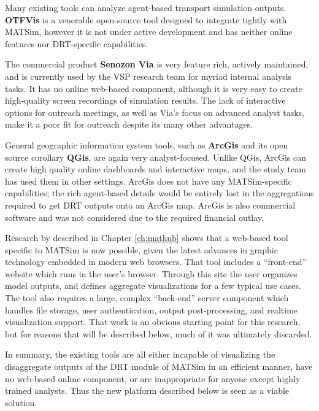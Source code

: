 Many existing tools can analyze agent-based transport simulation outputs. \textbf{OTFVis} \cite{Srippgen2015OTFVisInBook} is a venerable open-source tool designed to integrate tightly with MATSim, however it is not under active development and has neither online features nor DRT-specific capabilities.

The commercial product \textbf{Senozon Via} \cite{Rieser2015SenozonViaInBook} is very feature rich, actively maintained, and is currently used by the VSP research team for myriad internal analysis tasks. It has no online web-based component, although it is very easy to create high-quality screen recordings of simulation results. The lack of interactive options for outreach meetings, as well as Via's focus on advanced analyst tasks, make it a poor fit for outreach despite its many other advantages.

General geographic information system tools, such as \textbf{ArcGis} and its open source corollary \textbf{QGis}, are again very analyst-focused. Unlike QGis, ArcGis can create high quality online dashboards and interactive maps, and the study team has used them in other settings. ArcGis does not have any MATSim-specific capabilities; the rich agent-based details would be entirely lost in the aggregations required to get DRT outputs onto an ArcGis map. ArcGis is also commercial software and was not considered due to the required financial outlay.

Research by \citet{CharltonLaudan2020WebBasedVisualization} described in Chapter \ref{ch:mathub} shows that a web-based tool specific to MATSim is now possible, given the latest advances in graphic technology embedded in modern web browsers. That tool includes a ``front-end'' website which runs in the user's browser. Through this site the user organizes model outputs, and defines aggregate visualizations for a few typical use cases. The tool also requires a large, complex ``back-end'' server component which handles file storage, user authentication, output post-processing, and realtime visualization support. That work is an obvious starting point for this research, but for reasons that will be described below, much of it was ultimately discarded.

In summary, the existing tools are all either incapable of visualizing the disaggregate outputs of the DRT module of MATSim in an efficient manner, have no web-based online component, or are inappropriate for anyone except highly trained analysts. Thus the new platform described below is seen as a viable solution.

